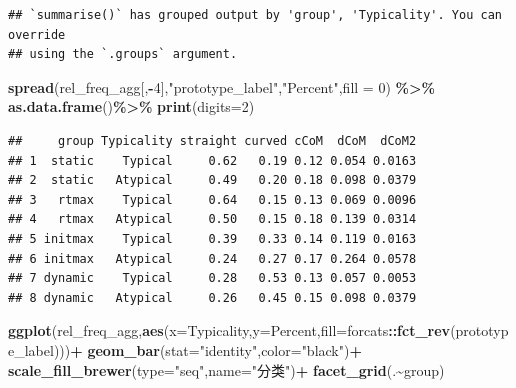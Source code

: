 \documentclass[
]{article}
\newenvironment{Shaded}{\begin{snugshade}}{\end{snugshade}}
\newcommand{\AttributeTok}[1]{\textcolor[rgb]{0.13,0.29,0.53}{#1}}
\newcommand{\DecValTok}[1]{\textcolor[rgb]{0.00,0.00,0.81}{#1}}
\newcommand{\FunctionTok}[1]{\textcolor[rgb]{0.13,0.29,0.53}{\textbf{#1}}}
\newcommand{\NormalTok}[1]{#1}
\newcommand{\SpecialCharTok}[1]{\textcolor[rgb]{0.81,0.36,0.00}{\textbf{#1}}}
\newcommand{\StringTok}[1]{\textcolor[rgb]{0.31,0.60,0.02}{#1}}
\begin{document}
\begin{verbatim}
## `summarise()` has grouped output by 'group', 'Typicality'. You can override
## using the `.groups` argument.
\end{verbatim}

\begin{Shaded}
\begin{Highlighting}[]
\FunctionTok{spread}\NormalTok{(rel\_freq\_agg[,}\SpecialCharTok{{-}}\DecValTok{4}\NormalTok{],}\StringTok{"prototype\_label"}\NormalTok{,}\StringTok{"Percent"}\NormalTok{,}\AttributeTok{fill =} \DecValTok{0}\NormalTok{) }\SpecialCharTok{\%\textgreater{}\%}
  \FunctionTok{as.data.frame}\NormalTok{()}\SpecialCharTok{\%\textgreater{}\%}
  \FunctionTok{print}\NormalTok{(}\AttributeTok{digits=}\DecValTok{2}\NormalTok{)}
\end{Highlighting}
\end{Shaded}

\begin{verbatim}
##     group Typicality straight curved cCoM  dCoM  dCoM2
## 1  static    Typical     0.62   0.19 0.12 0.054 0.0163
## 2  static   Atypical     0.49   0.20 0.18 0.098 0.0379
## 3   rtmax    Typical     0.64   0.15 0.13 0.069 0.0096
## 4   rtmax   Atypical     0.50   0.15 0.18 0.139 0.0314
## 5 initmax    Typical     0.39   0.33 0.14 0.119 0.0163
## 6 initmax   Atypical     0.24   0.27 0.17 0.264 0.0578
## 7 dynamic    Typical     0.28   0.53 0.13 0.057 0.0053
## 8 dynamic   Atypical     0.26   0.45 0.15 0.098 0.0379
\end{verbatim}

\begin{Shaded}
\begin{Highlighting}[]
\FunctionTok{ggplot}\NormalTok{(rel\_freq\_agg,}\FunctionTok{aes}\NormalTok{(}\AttributeTok{x=}\NormalTok{Typicality,}\AttributeTok{y=}\NormalTok{Percent,}\AttributeTok{fill=}\NormalTok{forcats}\SpecialCharTok{::}\FunctionTok{fct\_rev}\NormalTok{(prototype\_label)))}\SpecialCharTok{+}
  \FunctionTok{geom\_bar}\NormalTok{(}\AttributeTok{stat=}\StringTok{"identity"}\NormalTok{,}\AttributeTok{color=}\StringTok{"black"}\NormalTok{)}\SpecialCharTok{+}
  \FunctionTok{scale\_fill\_brewer}\NormalTok{(}\AttributeTok{type=}\StringTok{"seq"}\NormalTok{,}\AttributeTok{name=}\StringTok{"分类"}\NormalTok{)}\SpecialCharTok{+}
  \FunctionTok{facet\_grid}\NormalTok{(.}\SpecialCharTok{\textasciitilde{}}\NormalTok{group)}
\end{Highlighting}
\end{Shaded}
\end{document}
